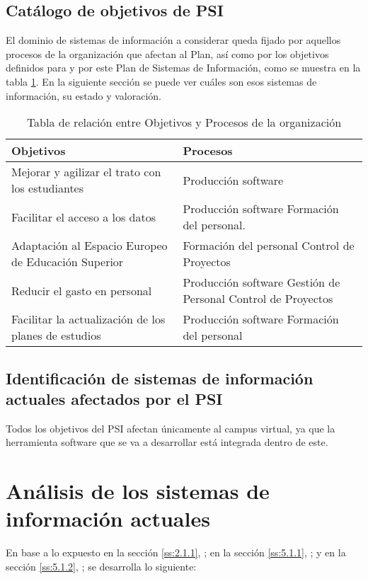 \documentclass[11pt,a4paper,spanish,twoside]{book}
\begin{document}
\subsection{Catálogo de objetivos de PSI} \label{ss:5.1.1}
El dominio de sistemas de información a considerar queda fijado por
aquellos procesos de la organización que afectan al Plan, así como por los 
objetivos definidos para y por este Plan de Sistemas de Información, como se
muestra en la tabla \ref{Tab:ObjPro}. En la siguiente sección se puede ver
cuáles son esos sistemas de información, su estado y valoración.

\begin{table}[!ht]
  \centering
  \begin{tabular}{p{5cm}|p{5cm}}
    \textbf{Objetivos} & \textbf{Procesos} \\
    \hline \hline
    Mejorar y agilizar el trato con los estudiantes & Producción software \\
    \hline
    Facilitar el acceso a los datos & 
    Producción software Formación del personal. \\
    \hline
    Adaptación al Espacio Europeo de Educación Superior & 
    Formación del personal Control de Proyectos \\
    \hline
    Reducir el gasto en personal & 
    Producción software Gestión de Personal Control de Proyectos\\
    \hline
    Facilitar la actualización de los planes de estudios & 
    Producción software Formación del personal \\
    \hline
  \end{tabular}
  \caption{Tabla de relación entre Objetivos y Procesos de la organización}
  \label{Tab:ObjPro}
\end{table}

\subsection{Identificación de sistemas de información actuales afectados por
  el PSI} \label{ss:5.1.2}
Todos los objetivos del PSI afectan únicamente al campus virtual, ya que la
herramienta software que se va a desarrollar está integrada dentro de este.

\section{Análisis de los sistemas de información actuales}
En base a lo expuesto 
en la sección \vref{ss:2.1.1}, \emph{}; 
en la sección \vref{ss:5.1.1}, \emph{}; y
en la sección \vref{ss:5.1.2}, \emph{}; 
se desarrolla lo siguiente:
\end{document}
